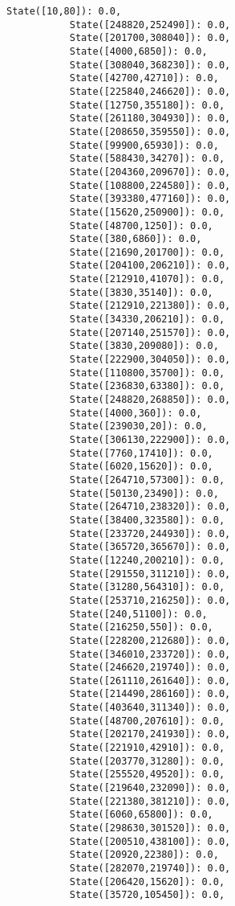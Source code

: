 \documentclass[11pt]{article}
\begin{document}
\begin{Verbatim}[commandchars=\\\{\}]
           State([10,80]): 0.0,
           State([248820,252490]): 0.0,
           State([201700,308040]): 0.0,
           State([4000,6850]): 0.0,
           State([308040,368230]): 0.0,
           State([42700,42710]): 0.0,
           State([225840,246620]): 0.0,
           State([12750,355180]): 0.0,
           State([261180,304930]): 0.0,
           State([208650,359550]): 0.0,
           State([99900,65930]): 0.0,
           State([588430,34270]): 0.0,
           State([204360,209670]): 0.0,
           State([108800,224580]): 0.0,
           State([393380,477160]): 0.0,
           State([15620,250900]): 0.0,
           State([48700,1250]): 0.0,
           State([380,6860]): 0.0,
           State([21690,201700]): 0.0,
           State([204100,206210]): 0.0,
           State([212910,41070]): 0.0,
           State([3830,35140]): 0.0,
           State([212910,221380]): 0.0,
           State([34330,206210]): 0.0,
           State([207140,251570]): 0.0,
           State([3830,209080]): 0.0,
           State([222900,304050]): 0.0,
           State([110800,35700]): 0.0,
           State([236830,63380]): 0.0,
           State([248820,268850]): 0.0,
           State([4000,360]): 0.0,
           State([239030,20]): 0.0,
           State([306130,222900]): 0.0,
           State([7760,17410]): 0.0,
           State([6020,15620]): 0.0,
           State([264710,57300]): 0.0,
           State([50130,23490]): 0.0,
           State([264710,238320]): 0.0,
           State([38400,323580]): 0.0,
           State([233720,244930]): 0.0,
           State([365720,365670]): 0.0,
           State([12240,200210]): 0.0,
           State([291550,311210]): 0.0,
           State([31280,564310]): 0.0,
           State([253710,216250]): 0.0,
           State([240,51100]): 0.0,
           State([216250,550]): 0.0,
           State([228200,212680]): 0.0,
           State([346010,233720]): 0.0,
           State([246620,219740]): 0.0,
           State([261110,261640]): 0.0,
           State([214490,286160]): 0.0,
           State([403640,311340]): 0.0,
           State([48700,207610]): 0.0,
           State([202170,241930]): 0.0,
           State([221910,42910]): 0.0,
           State([203770,31280]): 0.0,
           State([255520,49520]): 0.0,
           State([219640,232090]): 0.0,
           State([221380,381210]): 0.0,
           State([6060,65800]): 0.0,
           State([298630,301520]): 0.0,
           State([200510,438100]): 0.0,
           State([20920,22380]): 0.0,
           State([282070,219740]): 0.0,
           State([206420,15620]): 0.0,
           State([35720,105450]): 0.0,

\end{Verbatim}
\end{document}
